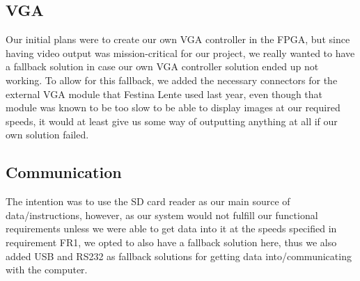 \subsection{VGA}
Our initial plans were to create our own \ac{VGA} controller in the \ac{FPGA}, but since having video output was mission-critical
for our project, we really wanted to have a fallback solution in case our own
\ac{VGA} controller solution ended up not working.
To allow for this fallback, we added the necessary connectors for the external \ac{VGA} module that Festina Lente used last year,
even though that module was known to be too slow to be able to display images at our required speeds, it would at least give us
some way of outputting anything at all if our own solution failed.

\subsection {Communication}
The intention was to use the \ac{SD} card reader as our main source of data/instructions, however, as our system would
not fulfill our functional requirements unless we were able to get data into it at the speeds specified in requirement
FR1, we opted to also have a fallback
solution here, thus we also added \ac{USB} and RS232 as fallback solutions for getting data into/communicating with the
computer.
